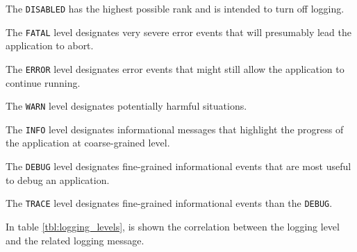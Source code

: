 \begin{etaremune}
  \item The \texttt{DISABLED} has the highest possible rank and is intended to
  turn off logging.

  \item The \texttt{FATAL} level designates very severe error events that will presumably
  lead the application to abort.

  \item The \texttt{ERROR} level designates error events that might still allow
  the application to continue running.

  \item The \texttt{WARN} level designates potentially harmful situations.

  \item The \texttt{INFO} level designates informational messages that highlight
  the progress of the application at coarse-grained level.

  \item The \texttt{DEBUG} level designates fine-grained informational events that
  are most useful to debug an application.

  \item The \texttt{TRACE} level designates fine-grained informational events
  than the \texttt{DEBUG}.
\end{etaremune}

In table \ref{tbl:logging_levels}, is shown the correlation between the logging
level and the related logging message.

